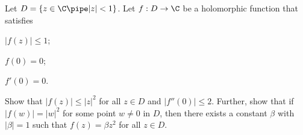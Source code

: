 Let $D=\{z\in \C \pipe  |z|<1\}$. Let $f:D\rightarrow \C$ be a holomorphic
function that satisfies
\begin{123list}
\item $|f(z)|\leq 1$;
\item $f(0)=0$;
\item $f'(0)=0$.
\end{123list}
Show that $|f(z)|\leq |z|^2$ for all $z\in D$ and $|f''(0)|\leq
2$. Further, show that if $|f(w)|=|w|^2$ for some point $w\neq 0$ in
$D$, then there exists a constant $\beta$ with $|\beta|=1$ such that
$f(z)=\beta z^2$ for all $z\in D$.
